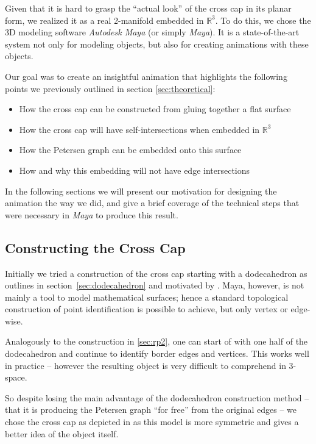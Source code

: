 \documentclass[11pt,            %
               a4paper,         %
               oneside,         %
               DIV12,           %
               fleqn,           %
               halfparskip,     %
               nochapterprefix, %
              ]{scrartcl} %
\theoremstyle{definition}
\begin{document}
Given that it is hard to grasp the “actual look” of the cross cap
in its planar form, we realized it as a real 2-manifold embedded in
$\mathbb{R}^3$. To do this, we chose the 3D modeling software
\emph{Autodesk Maya} (or simply \emph{Maya}). It is a state-of-the-art
system not only for modeling objects, but also for creating animations
with these objects.

Our goal was to create an insightful animation that highlights the
following points we previously outlined in section
\ref{sec:theoretical}:

\begin{itemize}
  \item How the cross cap can be constructed from gluing together a
    flat surface
  \item How the cross cap will have self-intersections when embedded
    in $\mathbb{R}^3$
  \item How the Petersen graph can be embedded onto this surface
  \item How and why this embedding will not have edge intersections
\end{itemize}

In the following sections we will present our motivation for designing
the animation the way we did, and give a brief coverage of the
technical steps that were necessary in \emph{Maya} to produce this
result.

\subsection{Constructing the Cross Cap}

Initially we tried a construction of the cross cap starting with a
dodecahedron as outlines in section~\ref{sec:dodecahedron} and
motivated by \cite[p.~270f]{bilderbuch}. Maya, however, is not mainly
a tool to model mathematical surfaces; hence a standard topological
construction of point identification is possible to achieve, but only
vertex or edge-wise.

Analogously to the construction in \ref{sec:rp2}, one can start of
with one half of the dodecahedron and continue to identify border
edges and vertices. This works well in practice -- however the
resulting object is very difficult to comprehend in 3-space.

So despite losing the main advantage of the dodecahedron construction
method -- that it is producing the Petersen graph “for free” from the
original edges -- we chose the cross cap as depicted in \cite[section~1.7]{rp2} as
this model is more symmetric and gives a better idea of the object
itself.
\end{document}
